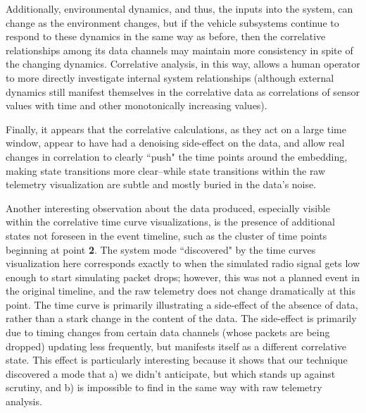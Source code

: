 Additionally, environmental dynamics, and thus, the inputs into the system, can change as the environment changes, but if the vehicle subsystems continue to respond to these dynamics in the same way as before, then the correlative relationships among its data channels may maintain more consistency in spite of the changing dynamics. Correlative analysis, in this way, allows a human operator to more directly investigate internal system relationships (although external dynamics still manifest themselves in the correlative data as correlations of sensor values with time and other monotonically increasing values).

Finally, it appears that the correlative calculations, as they act on a large time window, appear to have had a denoising side-effect on the data, and allow real changes in correlation to clearly ``push" the time points around the embedding, making state transitions more clear--while state transitions within the raw telemetry visualization are subtle and mostly buried in the data's noise.

Another interesting observation about the data produced, especially visible within the correlative time curve visualizations, is the presence of additional states not foreseen in the event timeline, such as the cluster of time points beginning at point \textbf{2}. The system mode ``discovered" by the time curves visualization here corresponds exactly to when the simulated radio signal gets low enough to start simulating packet drops; however, this was not a planned event in the original timeline, and the raw telemetry does not change dramatically at this point.  The time curve is primarily illustrating a side-effect of the absence of data, rather than a stark change in the content of the data. The side-effect is primarily due to timing changes from certain data channels (whose packets are being dropped) updating less frequently, but manifests itself as a different correlative state. This effect is particularly interesting because it shows that our technique discovered a mode that a) we didn't anticipate, but which stands up against scrutiny, and b) is impossible to find in the same way with raw telemetry analysis.

